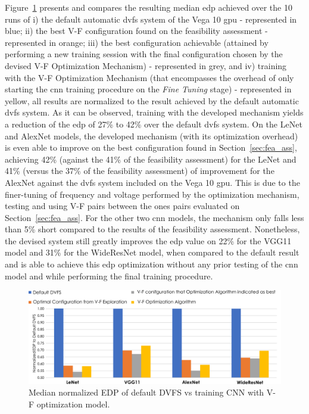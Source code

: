 Figure~\ref{fig:Algori_comp} presents and compares the resulting median \acrshort{edp} achieved over the 10 runs of 
i) the default automatic \acrshort{dvfs} system of the Vega 10 \acrshort{gpu} - represented in blue; 
ii) the best V-F configuration found on the feasibility assessment - represented in orange; 
iii) the best configuration achievable (attained by performing a new training session with the final configuration chosen by the devised V-F Optimization Mechanism) - represented in grey, and 
iv) training with the V-F Optimization Mechanism (that encompasses the overhead of only starting the \acrshort{cnn} training procedure on the \textit{Fine Tuning} stage) - represented in yellow, all results are normalized to the result achieved by the default automatic \acrshort{dvfs} system. 
As it can be observed, training with the developed mechanism yields a reduction of the \acrshort{edp} of 27\% to 42\% over the default \acrshort{dvfs} system. On the LeNet and AlexNet models, the developed mechanism (with its optimization overhead) is even able to improve on the best configuration found in Section~\ref{sec:fea_ass}, achieving 42\% (against the 41\% of the feasibility assessment) for the LeNet and 41\% (versus the 37\% of the feasibility assessment) of improvement for the AlexNet against the \acrshort{dvfs} system included on the Vega 10 \acrshort{gpu}. This is due to the finer-tuning of frequency and voltage performed by the optimization mechanism, testing and using V-F pairs between the ones pairs evaluated on Section~\ref{sec:fea_ass}. For the other two \acrshort{cnn} models, the mechanism only falls less than 5\% short compared to the results of the feasibility assessment. Nonetheless, the devised system still greatly improves the \acrshort{edp} value on 22\% for the VGG11 model and 31\% for the WideResNet model, when compared to the default result and is able to achieve this \acrshort{edp} optimization without any prior testing of the \acrshort{cnn} model and while performing the final training procedure.





\begin{figure}[htb]
    \centering
        \includegraphics[width=\textwidth]{Figures/Application To Deep Learning/Algorithm_Opt_comp.pdf}
        \caption{Median normalized EDP of default DVFS vs training CNN with V-F optimization model.}
    \label{fig:Algori_comp}
\end{figure}

